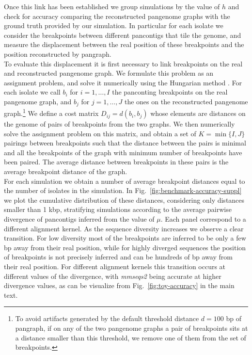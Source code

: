 \documentclass[aps,rmp,reprint,superscriptaddress,notitlepage,10pt,onecolumn]{revtex4-1}
\begin{document}
Once this link has been established we group simulations by the value of $h$ and check for accuracy comparing the reconstructed pangenome graphs with the ground truth provided by our simulation. In particular for each isolate we consider the breakpoints between different pancontigs that tile the genome, and measure the displacement between the real position of these breakpoints and the position reconstructed by pangraph.\\
To evaluate this displacement it is first necessary to link breakpoints on the real and reconstructed pangenome graph. We formulate this problem as an assignment problem, and solve it numerically using the Hungarian method \cite{kuhn1955hungarian}. For each isolate we call $b_i$ for $i=1,\ldots,I$ the panconting breakpoints on the real pangenome graph, and $b_j$ for $j=1,\ldots,J$ the ones on the reconstructed pangenome graph.\footnote{To avoid artifacts generated by the default threshold distance $d=100$ bp of pangraph, if on any of the two pangenome graphs a pair of breakpoints sits at a distance smaller than this threshold, we remove one of them from the set of breakpoints.} We define a cost matrix $D_{ij} = d(b_i,b_j)$ whose elements are distances on the genome of pairs of breakpoints from the two graphs. We then numerically solve the assignment problem on this matrix, and obtain a set of $K = \min\{ I,J \}$ pairings between breakpoints such that the distance between the pairs is minimal and all the breakpoints of the graph with minimum number of breakpoints have been paired. The average distance between breakpoints in these pairs is the average breakpoint distance of the graph.\\
For each simulation we obtain a number of average breakpoint distances equal to the number of isolates in the simulation. In Fig.~\ref{fig:benchmark-accuracy-suppl} we plot the cumulative distribution of these distances, considering only distances smaller than 1 kbp, stratifying simulations according to the average pairwise divergence of pancontigs inferred from the value of $\mu$. Each panel correspond to a different alignment kernel. As the sequence diversity increases we observe a clear transition. For low diversity most of the breakpoints are inferred to be only a few bp away from their real position, while for highly diverged sequences the position of breakpoints is not precisely inferred and can be hundreds of bp away from their real position. For different alignment kernels this transition occurs at different values of the divergence, with \textit{mmseqs2} being accurate at higher divergence values, as can be visualize from Fig.~\ref{fig:toy-accuracy} in the main text.
\end{document}
